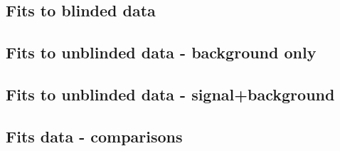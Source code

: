 \FloatBarrier
\subsection{Fits to blinded data}%
\label{sec:blinded}


\FloatBarrier
\subsection{Fits to unblinded data - background only}%
\label{sec:unblinded_Bonly}


\FloatBarrier
\subsection{Fits to unblinded data - signal+background}%
\label{sec:unblinded_SplusB}



\FloatBarrier
\subsection{Fits data - comparisons}%
\label{sec:fits_comparisons}


